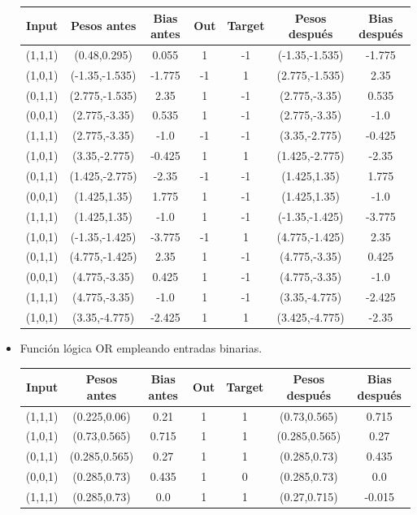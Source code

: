 \begin{problem}[16]
\begin{itemize}
\begin{center}
\begin{tabular}{|c|c|c|c|c|c|c|}
\hline
\textbf{Input} & \textbf{Pesos antes} &  \textbf{Bias antes} & \textbf{Out} & \textbf{Target} & \textbf{Pesos después} & \textbf{Bias después} \\
\hline
(1,1,1) & (0.48,0.295) & 0.055 & 1 & -1 & (-1.35,-1.535) & -1.775\\
(1,0,1) & (-1.35,-1.535) & -1.775 & -1 & 1 & (2.775,-1.535) & 2.35\\
(0,1,1) & (2.775,-1.535) & 2.35 & 1 & -1 & (2.775,-3.35) & 0.535\\
(0,0,1) & (2.775,-3.35) & 0.535 & 1 & -1 & (2.775,-3.35) & -1.0\\
(1,1,1) & (2.775,-3.35) & -1.0 & -1 & -1 & (3.35,-2.775) & -0.425\\
(1,0,1) & (3.35,-2.775) & -0.425 & 1 & 1 & (1.425,-2.775) & -2.35\\
(0,1,1) & (1.425,-2.775) & -2.35 & -1 & -1 & (1.425,1.35) & 1.775\\
(0,0,1) & (1.425,1.35) & 1.775 & 1 & -1 & (1.425,1.35) & -1.0\\
(1,1,1) & (1.425,1.35) & -1.0 & 1 & -1 & (-1.35,-1.425) & -3.775\\
(1,0,1) & (-1.35,-1.425) & -3.775 & -1 & 1 & (4.775,-1.425) & 2.35\\
(0,1,1) & (4.775,-1.425) & 2.35 & 1 & -1 & (4.775,-3.35) & 0.425\\
(0,0,1) & (4.775,-3.35) & 0.425 & 1 & -1 & (4.775,-3.35) & -1.0\\
(1,1,1) & (4.775,-3.35) & -1.0 & 1 & -1 & (3.35,-4.775) & -2.425\\
(1,0,1) & (3.35,-4.775) & -2.425 & 1 & 1 & (3.425,-4.775) & -2.35\\
\hline
\end{tabular}
\end{center}

\item Función lógica OR empleando entradas binarias.
\begin{center}
\begin{tabular}{|c|c|c|c|c|c|c|}
\hline
\textbf{Input} & \textbf{Pesos antes} &  \textbf{Bias antes} & \textbf{Out} & \textbf{Target} & \textbf{Pesos después} & \textbf{Bias después} \\
\hline
(1,1,1) & (0.225,0.06) & 0.21 & 1 & 1 & (0.73,0.565) & 0.715\\
(1,0,1) & (0.73,0.565) & 0.715 & 1 & 1 & (0.285,0.565) & 0.27\\
(0,1,1) & (0.285,0.565) & 0.27 & 1 & 1 & (0.285,0.73) & 0.435\\
(0,0,1) & (0.285,0.73) & 0.435 & 1 & 0 & (0.285,0.73) & 0.0\\
(1,1,1) & (0.285,0.73) & 0.0 & 1 & 1 & (0.27,0.715) & -0.015\\
\hline
\end{tabular}
\end{center}

\end{itemize}
\end{problem}


